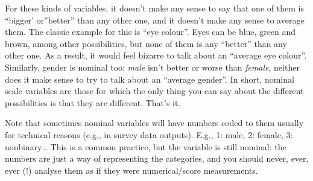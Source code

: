 \documentclass[
  11pt,
]{book}
\theoremstyle{definition}
\theoremstyle{definition}
\theoremstyle{definition}
\theoremstyle{definition}
\theoremstyle{remark}
\begin{document}
For these kinds of variables, it doesn't make any sense to say that one of them is ``bigger' or''better'' than any other one, and it doesn't make any sense to average them. The classic example for this is ``eye colour''. Eyes can be blue, green and brown, among other possibilities, but none of them is any ``better'' than any other one. As a result, it would feel bizarre to talk about an ``average eye colour''. Similarly, gender is nominal too: \emph{male} isn't better or worse than \emph{female}, neither does it make sense to try to talk about an ``average gender''. In short, nominal scale variables are those for which the only thing you can say about the different possibilities is that they are different. That's it.

Note that sometimes nominal variables will have numbers coded to them usually for technical reasons (e.g., in survey data outputs). E.g., 1: male, 2: female, 3: nonbinary\ldots{} This is a common practice, but the variable is still nominal: the numbers are just a way of representing the categories, and you should never, ever, ever (!) analyse them as if they were numerical/score measurements.
\end{document}
